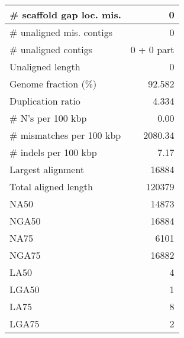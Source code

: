 \documentclass[12pt,a4paper]{article}
\begin{document}
\begin{table}[ht]
\begin{center}
\begin{tabular}{|l*{1}{|r}|}
\# scaffold gap loc. mis. & 0 \\ \hline
\# unaligned mis. contigs & 0 \\ \hline
\# unaligned contigs & 0 + 0 part \\ \hline
Unaligned length & 0 \\ \hline
Genome fraction (\%) & 92.582 \\ \hline
Duplication ratio & 4.334 \\ \hline
\# N's per 100 kbp & 0.00 \\ \hline
\# mismatches per 100 kbp & 2080.34 \\ \hline
\# indels per 100 kbp & 7.17 \\ \hline
Largest alignment & 16884 \\ \hline
Total aligned length & 120379 \\ \hline
NA50 & 14873 \\ \hline
NGA50 & 16884 \\ \hline
NA75 & 6101 \\ \hline
NGA75 & 16882 \\ \hline
LA50 & 4 \\ \hline
LGA50 & 1 \\ \hline
LA75 & 8 \\ \hline
LGA75 & 2 \\ \hline
\end{tabular}
\end{center}
\end{table}
\end{document}
